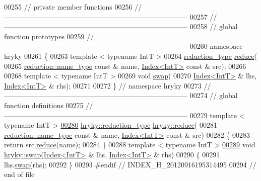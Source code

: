 \begin{DoxyCode}
00255 \textcolor{comment}{// private member functions}
00256 \textcolor{comment}{//
      ------------------------------------------------------------------------------}
00257 \textcolor{comment}{//
      ------------------------------------------------------------------------------}
00258 \textcolor{comment}{// global function prototypes}
00259 \textcolor{comment}{//
      ------------------------------------------------------------------------------}
00260 \textcolor{keyword}{namespace }hryky
00261 \{
00263     \textcolor{keyword}{template} < \textcolor{keyword}{typename} IntT >
00264     \hyperlink{classhryky_1_1_intrusive_ptr}{reduction_type} \hyperlink{namespacehryky_af41cb3af6766761da0ff21b84527a52c}{reduce}(
00265         \hyperlink{classhryky_1_1reduction_1_1_string}{reduction::name_type} \textcolor{keyword}{const} & name, \hyperlink{classhryky_1_1_index}{Index<IntT>} \textcolor{keyword}{const} & src);
00266 
00268     \textcolor{keyword}{template} < \textcolor{keyword}{typename} IntT >
00269     \textcolor{keywordtype}{void} \hyperlink{namespacehryky_a4282146df5ea2b68cb667896a2205909}{swap}(
00270         \hyperlink{classhryky_1_1_index}{Index<IntT>} & lhs, \hyperlink{classhryky_1_1_index}{Index<IntT>} & rhs);
00271 
00272 \} \textcolor{comment}{// namespace hryky}
00273 \textcolor{comment}{//
      ------------------------------------------------------------------------------}
00274 \textcolor{comment}{// global function definitions}
00275 \textcolor{comment}{//
      ------------------------------------------------------------------------------}
00279 \textcolor{comment}{}\textcolor{keyword}{template} < \textcolor{keyword}{typename} IntT >
\hypertarget{index_8h_source_l00280}{}\hyperlink{namespacehryky_ae17580260ffa431c10c056a8b1c88282}{00280} \hyperlink{classhryky_1_1_intrusive_ptr}{hryky::reduction_type} \hyperlink{namespacehryky_af41cb3af6766761da0ff21b84527a52c}{hryky::reduce}(
00281     \hyperlink{classhryky_1_1reduction_1_1_string}{reduction::name_type} \textcolor{keyword}{const} & name, \hyperlink{classhryky_1_1_index}{Index<IntT>} \textcolor{keyword}{const} & src)
00282 \{
00283     \textcolor{keywordflow}{return} src.\hyperlink{classhryky_1_1_index_a5994b0481f6f94baa69e5f4c141b86a7}{reduce}(name);
00284 \}
00288 \textcolor{keyword}{template} < \textcolor{keyword}{typename} IntT >
\hypertarget{index_8h_source_l00289}{}\hyperlink{namespacehryky_a805bdceb356edfcf8f183822a54421c0}{00289} \textcolor{keywordtype}{void} \hyperlink{namespacehryky_a4282146df5ea2b68cb667896a2205909}{hryky::swap}(\hyperlink{classhryky_1_1_index}{Index<IntT>} & lhs, \hyperlink{classhryky_1_1_index}{Index<IntT>} & rhs)
00290 \{
00291     lhs.\hyperlink{classhryky_1_1_index_a5566075def89b43a67fc8d95ff257791}{swap}(rhs);
00292 \}
00293 \textcolor{preprocessor}{#endif // INDEX\_H\_20120916195314495}
00294 \textcolor{preprocessor}{}\textcolor{comment}{// end of file}
\end{DoxyCode}
